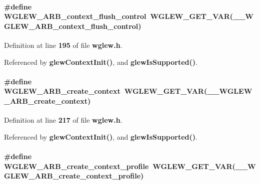 \paragraph[{W\+G\+L\+E\+W\+\_\+\+A\+R\+B\+\_\+context\+\_\+flush\+\_\+control}]{\setlength{\rightskip}{0pt plus 5cm}\#define W\+G\+L\+E\+W\+\_\+\+A\+R\+B\+\_\+context\+\_\+flush\+\_\+control~{\bf W\+G\+L\+E\+W\+\_\+\+G\+E\+T\+\_\+\+V\+AR}({\bf \+\_\+\+\_\+\+W\+G\+L\+E\+W\+\_\+\+A\+R\+B\+\_\+context\+\_\+flush\+\_\+control})}\label{wglew_8h_a865af766ab97a53304244c11eb837021}


Definition at line {\bf 195} of file {\bf wglew.\+h}.



Referenced by {\bf glew\+Context\+Init()}, and {\bf glew\+Is\+Supported()}.

\paragraph[{W\+G\+L\+E\+W\+\_\+\+A\+R\+B\+\_\+create\+\_\+context}]{\setlength{\rightskip}{0pt plus 5cm}\#define W\+G\+L\+E\+W\+\_\+\+A\+R\+B\+\_\+create\+\_\+context~{\bf W\+G\+L\+E\+W\+\_\+\+G\+E\+T\+\_\+\+V\+AR}({\bf \+\_\+\+\_\+\+W\+G\+L\+E\+W\+\_\+\+A\+R\+B\+\_\+create\+\_\+context})}\label{wglew_8h_a12396dce1daddd51669cf05d6530526e}


Definition at line {\bf 217} of file {\bf wglew.\+h}.



Referenced by {\bf glew\+Context\+Init()}, and {\bf glew\+Is\+Supported()}.

\paragraph[{W\+G\+L\+E\+W\+\_\+\+A\+R\+B\+\_\+create\+\_\+context\+\_\+profile}]{\setlength{\rightskip}{0pt plus 5cm}\#define W\+G\+L\+E\+W\+\_\+\+A\+R\+B\+\_\+create\+\_\+context\+\_\+profile~{\bf W\+G\+L\+E\+W\+\_\+\+G\+E\+T\+\_\+\+V\+AR}({\bf \+\_\+\+\_\+\+W\+G\+L\+E\+W\+\_\+\+A\+R\+B\+\_\+create\+\_\+context\+\_\+profile})}\label{wglew_8h_a083228d2d2a2bf19017af2904f9b244e}


